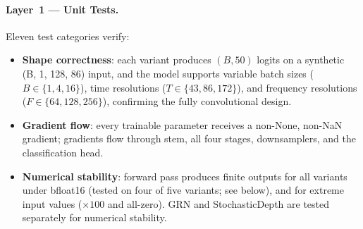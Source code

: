 \documentclass{article}
\begin{document}
\paragraph{Layer~1 --- Unit Tests.}
Eleven test categories verify:
\begin{itemize}
  \item \textbf{Shape correctness}: each variant produces $(B, 50)$ logits on a
  synthetic (B, 1, 128, 86) input, and the model supports variable batch sizes
  ($B \in \{1, 4, 16\}$), time resolutions ($T \in \{43, 86, 172\}$), and
  frequency resolutions ($F \in \{64, 128, 256\}$), confirming the fully
  convolutional design.
  \item \textbf{Gradient flow}: every trainable parameter receives a non-None,
  non-NaN gradient; gradients flow through stem, all four stages, downsamplers,
  and the classification head.
  \item \textbf{Numerical stability}: forward pass produces finite outputs for
  all variants under bfloat16 (tested on four of five variants; see below), and
  for extreme input values ($\times 100$ and all-zero). GRN and StochasticDepth
  are tested separately for numerical stability.
\end{itemize}
\end{document}
